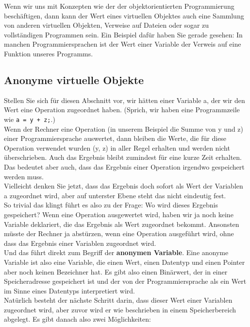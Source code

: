 Wenn wir uns mit Konzepten wie der der objektorientierten Programmierung beschäftigen, dann kann der Wert eines virtuellen Objektes auch eine Sammlung von anderen virtuellen Objekten, Verweise auf Dateien oder sogar zu vollständigen Programmen sein. Ein Beispiel dafür haben Sie gerade gesehen: In manchen Programmiersprachen ist der Wert einer Variable der Verweis auf eine Funktion unseres Programms.

\subsection{Anonyme virtuelle Objekte}

Stellen Sie sich für diesen Abschnitt vor, wir hätten einer Variable a, der wir den Wert eine Operation zugeordnet haben. (Sprich, wir haben eine Programmzeile wie \verb|a = y + z;|.)\\

Wenn der Rechner eine Operation (in unserem Beispiel die Summe von y und z) einer Programmiersprache auswertet, dann bleiben die Werte, die für diese Operation verwendet wurden (y, z) in aller Regel erhalten und werden nicht überschrieben. Auch das Ergebnis bleibt zumindest für eine kurze Zeit erhalten. Das bedeutet aber auch, dass das Ergebnis einer Operation irgendwo gespeichert werden muss.\\

Vielleicht denken Sie jetzt, dass das Ergebnis doch sofort als Wert der Variablen a zugeordnet wird, aber auf unterster Ebene steht das nicht eindeutig fest.\\

So trivial das klingt führt es also zu der Frage: Wo wird dieses Ergebnis gespeichert? Wenn eine Operation ausgewertet wird, haben wir ja noch keine Variable deklariert, die das Ergebnis als Wert zugeordnet bekommt. Ansonsten müsste der Rechner ja abstürzen, wenn eine Operation ausgeführt wird, ohne dass das Ergebnis einer Variablen zugeordnet wird.\\

Und das führt direkt zum Begriff der \textbf{anonymen Variable}. Eine anonyme Variable ist also eine Variable, die einen Wert, einen Datentyp und einen Pointer aber noch keinen Bezeichner hat. Es gibt also einen Binärwert, der in einer Speicheradresse gespeichert ist und der von der Programmiersprache als ein Wert im Sinne eines Datentyps interpretiert wird.\\

Natürlich besteht der nächste Schritt darin, dass dieser Wert einer Variablen zugeordnet wird, aber zuvor wird er wie beschrieben in einem Speicherbereich abgelegt. Es gibt danach also zwei Möglichkeiten: 

